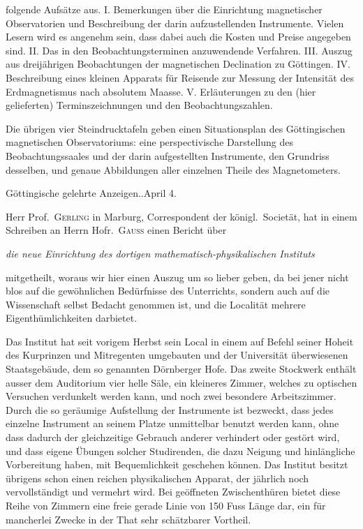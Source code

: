 folgende Aufsätze aus. I. Bemerkungen über die Einrichtung magnetischer Observatorien und Beschreibung der darin aufzustellenden Instrumente. Vielen Lesern wird es angenehm sein, dass dabei auch die Kosten und Preise angegeben sind. II. Das in den Beobachtungsterminen anzuwendende Verfahren. III. Auszug aus dreijährigen Beobachtungen der magnetischen Declination zu Göttingen. IV. Beschreibung eines kleinen Apparats für Reisende zur Messung der Intensität des Erdmagnetismus nach absolutem Maasse. V. Erläuterungen zu den (hier gelieferten) Terminszeichnungen und den Beobachtungszahlen.

Die übrigen vier Steindrucktafeln geben einen Situationsplan des Göttingischen magnetischen Observatoriums: eine perspectivische Darstellung des Beobachtungssaales und der darin aufgestellten Instrumente, den Grundriss desselben, und genaue Abbildungen aller einzelnen Theile des Magnetometers.

\vspace{6mm}
\begin{center}\small Göttingische gelehrte Anzeigen..\quad April 4.\end{center}

Herr Prof.\ \textsc{Gerling} in Marburg, Correspondent der königl.\ Societät, hat in einem Schreiben an Herrn Hofr.\ \textsc{Gauss} einen Bericht über
\begin{center}\textit{die neue Einrichtung des dortigen mathematisch-physikalischen Instituts}\end{center}
mitgetheilt, woraus wir hier einen Auszug um so lieber geben, da bei jener nicht blos auf die gewöhnlichen Bedürfnisse des Unterrichts, sondern auch auf die Wissenschaft selbst Bedacht genommen ist, und die Localität mehrere Eigenthümlichkeiten darbietet.

Das Institut hat seit vorigem Herbst sein Local in einem auf Befehl seiner Hoheit des Kurprinzen und Mitregenten umgebauten und der Universität überwiesenen Staatsgebäude, dem so genannten Dörnberger Hofe. Das zweite Stockwerk enthält ausser dem Auditorium vier helle Säle, ein kleineres Zimmer, welches zu optischen Versuchen verdunkelt werden kann, und noch zwei besondere Arbeitszimmer. Durch die so geräumige Aufstellung der Instrumente ist bezweckt, dass jedes einzelne Instrument an seinem Platze unmittelbar benutzt werden kann, ohne dass dadurch der gleichzeitige Gebrauch anderer verhindert oder
gestört wird, und dass eigene Übungen solcher Studirenden, die dazu Neigung und hinlängliche Vorbereitung haben, mit Bequemlichkeit geschehen können. Das Institut besitzt übrigens schon einen reichen physikalischen Apparat, der jährlich noch vervollständigt und vermehrt wird. Bei geöffneten Zwischenthüren bietet diese Reihe von Zimmern eine freie gerade Linie von 150 Fuss Länge dar, ein für mancherlei Zwecke in der That sehr schätzbarer Vortheil.

